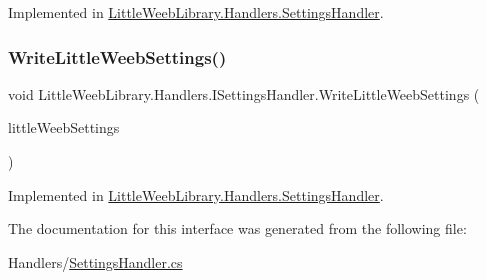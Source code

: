 Implemented in \mbox{\hyperlink{class_little_weeb_library_1_1_handlers_1_1_settings_handler_ad42462e9e851301c5f5b91663dc3fe24}{Little\+Weeb\+Library.\+Handlers.\+Settings\+Handler}}.

\mbox{\label{interface_little_weeb_library_1_1_handlers_1_1_i_settings_handler_a6b2cfe838785ae84db9608fb041c5fb5}} 
\subsubsection{\texorpdfstring{Write\+Little\+Weeb\+Settings()}{WriteLittleWeebSettings()}}
{\footnotesize\ttfamily void Little\+Weeb\+Library.\+Handlers.\+I\+Settings\+Handler.\+Write\+Little\+Weeb\+Settings (\begin{DoxyParamCaption}\item[{\mbox{\hyperlink{class_little_weeb_library_1_1_settings_1_1_little_weeb_settings}{Little\+Weeb\+Settings}}}]{little\+Weeb\+Settings }\end{DoxyParamCaption})}



Implemented in \mbox{\hyperlink{class_little_weeb_library_1_1_handlers_1_1_settings_handler_af5a1ea4a3605d938b363e83268774d6f}{Little\+Weeb\+Library.\+Handlers.\+Settings\+Handler}}.



The documentation for this interface was generated from the following file\+:\begin{DoxyCompactItemize}
\item 
Handlers/\mbox{\hyperlink{_settings_handler_8cs}{Settings\+Handler.\+cs}}\end{DoxyCompactItemize}
